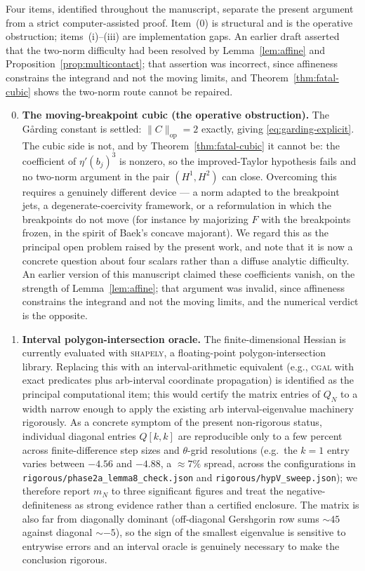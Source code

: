 \documentclass[11pt]{amsart}
\theoremstyle{plain}
\theoremstyle{definition}
\begin{document}
Four items, identified throughout the manuscript, separate the
present argument from a strict computer-assisted proof.  Item~(0) is
structural and is the operative obstruction; items~(i)--(iii) are
implementation gaps.  An earlier draft asserted that the two-norm
difficulty had been resolved by Lemma~\ref{lem:affine} and
Proposition~\ref{prop:multicontact}; that assertion was incorrect,
since affineness constrains the integrand and not the moving limits,
and Theorem~\ref{thm:fatal-cubic} shows the two-norm route cannot be
repaired.
\begin{enumerate}
\setcounter{enumi}{-1}
\item \textbf{The moving-breakpoint cubic (the operative
obstruction).}  The G\aa rding constant is settled:
$\|C\|_{\mathrm{op}}=2$ exactly, giving \eqref{eq:garding-explicit}.
The cubic side is not, and by Theorem~\ref{thm:fatal-cubic} it cannot
be: the coefficient of $\eta'(b_{j})^{3}$ is nonzero, so the
improved-Taylor hypothesis fails and no two-norm argument in the pair
$(H^{1},H^{2})$ can close.  Overcoming this requires a genuinely
different device --- a norm adapted to the breakpoint jets, a
degenerate-coercivity framework, or a reformulation in which the
breakpoints do not move (for instance by majorizing $F$ with the
breakpoints frozen, in the spirit of Baek's concave majorant).  We
regard this as the principal open problem raised by the present work,
and note that it is now a concrete question about four scalars rather
than a diffuse analytic difficulty.  An earlier version of this
manuscript claimed these coefficients vanish, on the strength of
Lemma~\ref{lem:affine}; that argument was invalid, since affineness
constrains the integrand and not the moving limits, and the numerical
verdict is the opposite.
\item \textbf{Interval polygon-intersection oracle.}
The finite-dimensional Hessian is currently evaluated with
\textsc{shapely}, a floating-point polygon-intersection library.
Replacing this with an interval-arithmetic equivalent (e.g.,
\textsc{cgal} with exact predicates plus arb-interval coordinate
propagation) is identified as the principal computational item;
this would certify the matrix entries of $Q_{N}$ to a width
narrow enough to apply the existing arb interval-eigenvalue
machinery rigorously.  As a concrete symptom of the present
non-rigorous status, individual diagonal entries $Q[k,k]$ are
reproducible only to a few percent across finite-difference step
sizes and $\theta$-grid resolutions (e.g.\ the $k=1$ entry varies
between $-4.56$ and $-4.88$, a $\approx 7\%$ spread, across the
configurations in \texttt{rigorous/phase2a\_lemma8\_check.json} and
\texttt{rigorous/hypV\_sweep.json}); we therefore report $m_{N}$ to
three significant figures and treat the negative-definiteness as
strong evidence rather than a certified enclosure.  The matrix is
also far from diagonally dominant (off-diagonal Gershgorin row sums
$\sim 45$ against diagonal $\sim -5$), so the sign of the smallest
eigenvalue is sensitive to entrywise errors and an interval oracle
is genuinely necessary to make the conclusion rigorous.


\end{enumerate}
\end{document}
